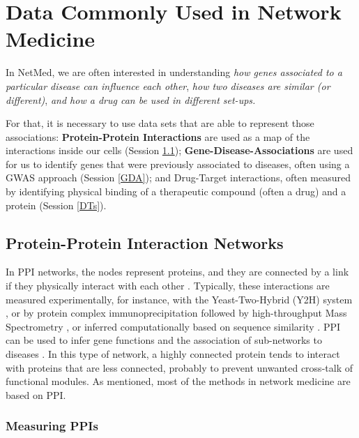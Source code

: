 \documentclass[
]{book}
\begin{document}
\hypertarget{data-commonly-used-in-network-medicine}{%
\chapter{Data Commonly Used in Network Medicine}\label{data-commonly-used-in-network-medicine}}

In NetMed, we are often interested in understanding \emph{how genes associated to a particular disease can influence each other}, \emph{how two diseases are similar (or different)}, \emph{and how a drug can be used in different set-ups.}

For that, it is necessary to use data sets that are able to represent those associations: \textbf{Protein-Protein Interactions} are used as a map of the interactions inside our cells (Session \ref{PPI}); \textbf{Gene-Disease-Associations} are used for us to identify genes that were previously associated to diseases, often using a GWAS approach (Session \ref{GDA}); and Drug-Target interactions, often measured by identifying physical binding of a therapeutic compound (often a drug) and a protein (Session \ref{DTs}).

\hypertarget{PPI}{%
\section{Protein-Protein Interaction Networks}\label{PPI}}

In PPI networks, the nodes represent proteins, and they are connected by a link if they physically interact with each other \citep{rual2005}. Typically, these interactions are measured experimentally, for instance, with the Yeast-Two-Hybrid (Y2H) system \citep{uetz2000}, or by protein complex immunoprecipitation followed by high-throughput Mass Spectrometry \citep{zhang2008, koh2012}, or inferred computationally based on sequence similarity \citep{fong2004}. PPI can be used to infer gene functions and the association of sub-networks to diseases \citep{Menche2015}. In this type of network, a highly connected protein tends to interact with proteins that are less connected, probably to prevent unwanted cross-talk of functional modules. As mentioned, most of the methods in network medicine are based on PPI.

\hypertarget{measuring-ppis}{%
\subsection{Measuring PPIs}\label{measuring-ppis}}
\end{document}
